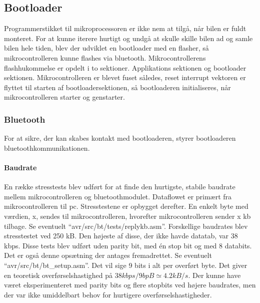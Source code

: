 \subsection{Bootloader}
Programmerstikket til mikroprocessoren er ikke nem at tilgå, når bilen er fuldt monteret. For at kunne iterere hurtigt og undgå at skulle skille bilen ad og samle bilen hele tiden, blev der udviklet en bootloader med en flasher, så mikrocontrolleren kunne flashes via bluetooth.
Mikrocontrollerens flashhukommelse er opdelt i to sektioner. Applikations sektionen og bootloader sektionen. Mikrocontrolleren er blevet fuset således, reset interrupt vektoren er flyttet til starten af bootloadersektionen, så bootloaderen initialiseres, når mikrocontrolleren starter og genstarter.

\subsubsection{Bluetooth}
For at sikre, der kan skabes kontakt med bootloaderen, styrer bootloaderen bluetoothkommunikationen.
\paragraph{Baudrate}
En række stresstests blev udført for at finde den hurtigste, stabile baudrate mellem mikrocontrolleren og bluetoothmodulet. Dataflowet er primært fra mikrocontrolleren til pc. Stresstestene er opbygget derefter.
En enkelt byte med værdien, x, sendes til mikrocontrolleren, hvorefter mikrocontrolleren sender x kb tilbage.
Se eventuelt \mbox{``avr/src/bt/tests/replykb.asm''}.
Forskellige baudrates blev stresstestet ved 250 kB. Den højeste af disse, der ikke havde datatab, var 38 kbps. Disse tests blev udført uden parity bit, med én stop bit og med 8 databits. Det er også denne opsætning der antages fremadrettet. Se eventuelt \mbox{``avr/src/bt/bt\_setup.asm''}. Det vil sige 9 bits i alt per overført byte. Det giver en teoretisk overførselshastighed på $38 kbps / 9 bpB \simeq 4.2 kB/s$. Der kunne have været eksperimenteret med parity bits og flere stopbits ved højere baudrates, men der var ikke umiddelbart behov for hurtigere overførselshastigheder.
